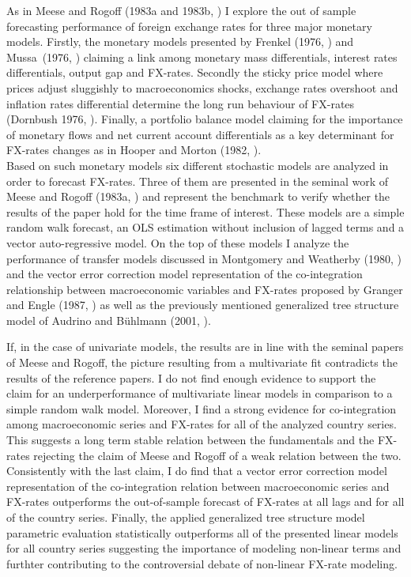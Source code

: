 As in Meese and Rogoff (1983a and 1983b,
\cite{MeeseRogoffa,MeeseRogoffb}) I explore the out of sample
forecasting performance of foreign exchange rates for three major
monetary models. Firstly, the monetary models presented by Frenkel
(1976, \cite{Frenkel1976}) and Mussa\ (1976, \cite{Mussa1976})
claiming a link among monetary mass differentials, interest rates
differentials, output gap and FX-rates. Secondly the sticky price
model where prices adjust sluggishly to macroeconomics shocks,
exchange rates overshoot and inflation rates differential determine
the long run behaviour of FX-rates (Dornbush 1976,
\cite{Dornbusch}). Finally, a portfolio balance model claiming for the
importance of monetary flows and net current account differentials as
a key determinant for FX-rates changes as in Hooper and Morton (1982,
\cite{HooperMorton1982}).\\
Based on such monetary models six different stochastic models are
analyzed in order to forecast FX-rates. Three of them are presented in
the seminal work of Meese and Rogoff (1983a, \cite{MeeseRogoffa}) and
represent the benchmark to verify whether the results of the paper
hold for the time frame of interest. These models are a simple random
walk forecast, an OLS estimation without inclusion of lagged terms and
a vector auto-regressive model. On the top of these models I analyze
the performance of transfer models discussed in Montgomery and
Weatherby (1980, \cite{MontgomeryWeatherby}) and the vector error
correction model representation of the co-integration relationship
between macroeconomic variables and FX-rates proposed by Granger and
Engle (1987, \cite{EngleGranger}) as well as the previously mentioned
generalized tree structure model of Audrino and B{\"u}hlmann (2001,
\cite{AudrinoBuhlmann}).

If, in the case of univariate models, the results are in line with the
seminal papers of Meese and Rogoff, the picture resulting from a
multivariate fit contradicts the results of the reference papers. I do
not find enough evidence to support the claim for an underperformance
of multivariate linear models in comparison to a simple random walk
model. Moreover, I find a strong evidence for co-integration among
macroeconomic series and FX-rates for all of the analyzed country
series. This suggests a long term stable relation between the
fundamentals and the FX-rates rejecting the claim of Meese and Rogoff
of a weak relation between the two. Consistently with the last claim,
I do find that a vector error correction model representation of the
co-integration relation between macroeconomic series and FX-rates
outperforms the out-of-sample forecast of FX-rates at all lags and for
all of the country series. Finally, the applied generalized tree
structure model parametric evaluation statistically outperforms all of
the presented linear models for all country series suggesting
the importance of modeling non-linear terms and furthter contributing
to the controversial debate of non-linear FX-rate modeling.

